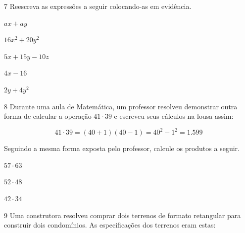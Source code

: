 \num{7} Reescreva as expressões a seguir colocando-as em evidência.

\begin{escolha}[itemsep=0pt]
\item $ax + ay$
\item $16x^2 + 20y^2$
\item $5x + 15y - 10z$
\item $4x - 16$
\item $2y + 4y^2$
    
\end{escolha}

\num{8} Durante uma aula de Matemática, um professor resolveu demonstrar
outra forma de calcular a operação $41 \cdot 39$ e escreveu seus cálculos na
lousa assim:

$$41 \cdot 39 = (40 + 1) (40 - 1) = 40^2 - 1^2 = 1.599$$

Seguindo a mesma forma exposta pelo professor, calcule os produtos a seguir.

\begin{escolha}[itemsep=0pt]
\item $57 \cdot 63$
    


\item $52 \cdot 48$



\item $42 \cdot 34$


\end{escolha}

\num{9} Uma construtora resolveu comprar dois terrenos de formato retangular
para construir dois condomínios. As especificações dos terrenos eram estas:

